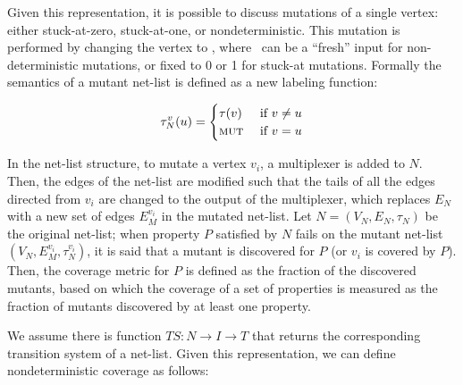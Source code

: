 Given this representation, it is possible to discuss mutations of a single vertex: either stuck-at-zero, stuck-at-one, or nondeterministic.  This mutation is performed by changing the vertex to \mutnode, where \mutnode\ can be a ``fresh'' input for non-deterministic mutations, or fixed to 0 or 1 for stuck-at mutations. Formally the semantics of a mutant net-list is defined as a new labeling function:

\[ \tau^{v}_{N}(u) = \begin{cases}
    \tau(v) & \textrm{ if $v \neq u$} \\
    \textrm{{\sc mut}}   & \textrm{ if $v = u$}
\end{cases}  \]
\noindent

In the net-list structure, to mutate a vertex $v_i$, a  multiplexer is added to $N$. Then, the  edges  of  the  net-list are modified such  that  the  tails  of  all  the edges directed from
$v_i$ are changed to the output of the multiplexer, which replaces
$E_N$ with a new set of edges $E^{v_i}_M$ in the mutated net-list. 
Let  $N = (V_N,E_N, \tau_N)$ be the original net-list;
when property $P$ satisfied by $N$ fails on the mutant net-list $(V_N, E^{v_i}_M, \tau^{v_i}_{N})$, it is said that a mutant is discovered for $P$ (or $v_i$ is covered by $P$).
Then, the coverage metric for $P$ is defined as the fraction of the discovered mutants, based on which the coverage of a set of properties is measured as the fraction of mutants discovered by at least one property.



\iffalse
We assume there is function $TS : N \rightarrow I \rightarrow T$ that returns the corresponding transition system of a net-list. Given this representation, we can define nondeterministic coverage as follows:

